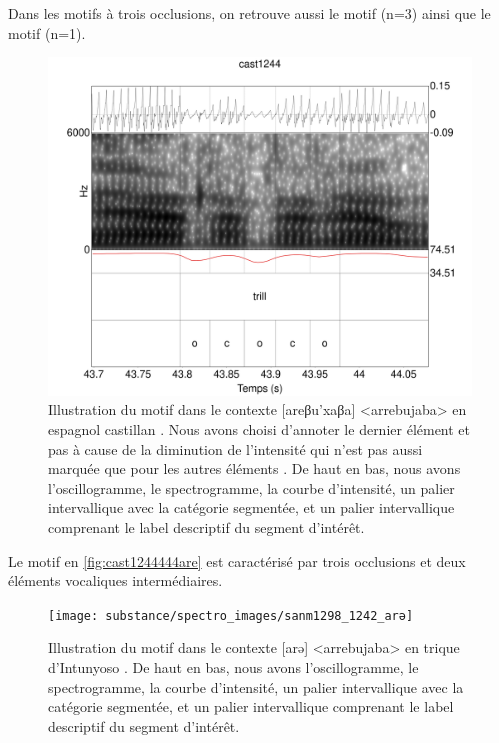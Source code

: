 Dans les motifs à trois occlusions, on retrouve aussi le motif  (n=3) ainsi que le motif  (n=1).\\

\begin{figure}
\centering
	\includegraphics[width=0.7\linewidth]{substance/spectro_images/cast1244_444_are}
	\caption[Illustration du motif ]{Illustration du motif  dans le contexte [areβu'xaβa] <arrebujaba> en espagnol castillan . Nous avons choisi d'annoter le dernier élément  et pas  à cause de la diminution de l'intensité qui n'est pas aussi marquée que pour les autres éléments . De haut en bas, nous avons l'oscillogramme, le spectrogramme, la courbe d'intensité, un palier intervallique avec la catégorie segmentée, et un palier intervallique comprenant le label descriptif du segment d'intérêt.}
	\label{fig:cast1244444are}
\end{figure}

Le motif  en \autoref{fig:cast1244444are} est caractérisé par trois occlusions et deux éléments vocaliques intermédiaires.\\

\begin{figure}
	\centering
	\texttt{[image: substance/spectro\_images/sanm1298\_1242\_arə]}
	\caption[Illustration du motif ]{Illustration du motif  dans le contexte [arə] <arrebujaba> en trique d'Intunyoso . De haut en bas, nous avons l'oscillogramme, le spectrogramme, la courbe d'intensité, un palier intervallique avec la catégorie segmentée, et un palier intervallique comprenant le label descriptif du segment d'intérêt.}
	\label{fig:sanm12981242ar}
\end{figure}

